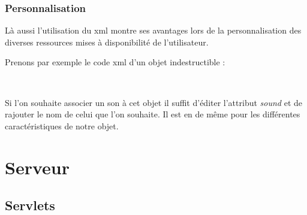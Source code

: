 		\subsubsection{Personnalisation}
	
			Là aussi l'utilisation du \gls{xml} montre ses avantages lors de la personnalisation
			des diverses ressources mises à disponibilité de l'utilisateur.
			
			Prenons par exemple le code \gls{xml} d'un objet indestructible :
			
			$\,$
		
			\begin{footnotesize}
			\end{footnotesize}
			
			Si l'on souhaite associer un son à cet objet il suffit d'éditer l'attribut \emph{sound}
			et de rajouter le nom de celui que l'on souhaite.
			Il est en de même pour les différentes caractéristiques de notre objet.		

\section{Serveur}

	\subsection{Servlets}